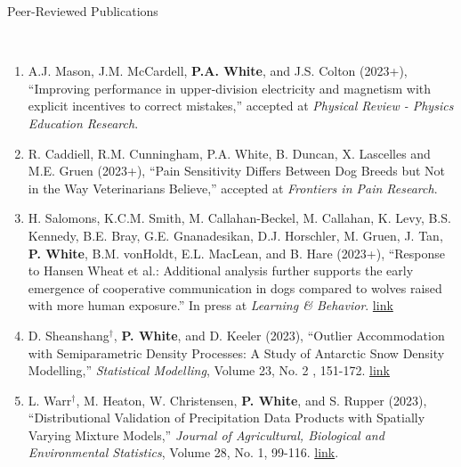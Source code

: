 \documentclass[11pt]{article}
\newcommand{\head}[1]{ %
    \bigskip %
    \begin{large}\begin{bf}{#1}\end{bf}\end{large} %

    \ \\ [-1.3cm] %

    \hrulefill}
\begin{document}
\vspace{2mm}
\head{Peer-Reviewed Publications}

\begin{enumerate}[label=$\bullet$]





\item A.J. Mason, J.M. McCardell, \textbf{P.A. White}, and J.S. Colton (2023+), ``Improving performance in upper-division electricity and magnetism with explicit incentives to correct mistakes,'' accepted at \emph{Physical Review - Physics Education Research}. 

\item R. Caddiell, R.M. Cunningham, P.A. White, B. Duncan, X. Lascelles and M.E. Gruen (2023+), ``Pain Sensitivity Differs Between Dog Breeds but Not in the Way Veterinarians Believe,'' accepted at \emph{Frontiers in Pain Research}. 

\item H. Salomons, K.C.M. Smith, M. Callahan-Beckel, M. Callahan, K. Levy, B.S. Kennedy, B.E. Bray, G.E. Gnanadesikan, D.J. Horschler, M. Gruen, J. Tan, \textbf{P. White}, B.M. vonHoldt, E.L. MacLean, and B. Hare (2023+), ``Response to Hansen Wheat et al.: Additional analysis further supports the early emergence of cooperative communication in dogs compared to wolves raised with more human exposure.'' In press at \emph{Learning \& Behavior}. \href{https://doi.org/10.3758/s13420-023-00576-2}{link}




\item D. Sheanshang$^\dagger$, \textbf{P. White}, and D. Keeler (2023), ``Outlier Accommodation with Semiparametric Density Processes: A Study of Antarctic Snow Density Modelling,''  \emph{Statistical Modelling}, Volume 23, No. 2 , 151-172. \href{https://doi.org/10.1177/1471082X211043946}{link}



\item L. Warr$^\dagger$, M. Heaton, W. Christensen, \textbf{P. White}, and S. Rupper (2023), ``Distributional Validation of Precipitation Data Products with Spatially Varying Mixture Models,'' \emph{Journal of Agricultural, Biological and Environmental Statistics}, Volume 28, No. 1, 99-116. \href{https://doi.org/10.1007/s13253-022-00515-0}{link}.


\end{enumerate}
\end{document}
